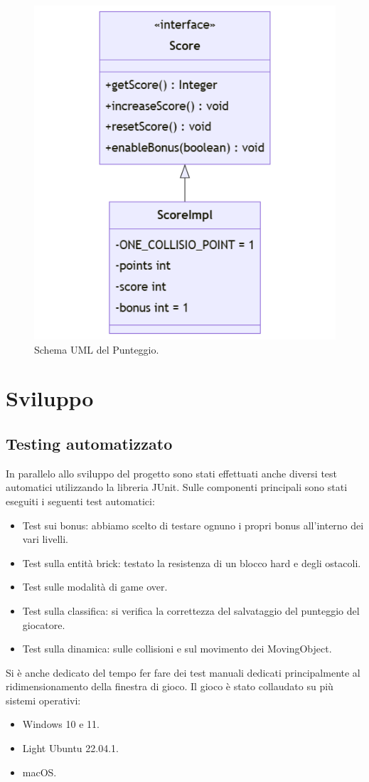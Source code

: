 \documentclass[a4paper,12pt]{report}
\begin{document}
\begin{figure}[H]
    \centering{}
    \includegraphics[scale=0.6]{images/Score.png}
    \caption{Schema UML del Punteggio.}
    \label{images:Score}
\end{figure}
\pagebreak
\chapter{Sviluppo}
\section{Testing automatizzato}
In parallelo allo sviluppo del progetto sono stati effettuati anche diversi test automatici utilizzando la libreria JUnit.
Sulle componenti principali sono stati eseguiti i seguenti test automatici:
\begin{itemize}
    \item Test sui bonus: abbiamo scelto di testare ognuno i propri bonus all'interno dei vari livelli.
    \item Test sulla entità brick: testato la resistenza di un blocco hard e degli ostacoli.
    \item Test sulle modalità di game over.
    \item Test sulla classifica: si verifica la correttezza del salvataggio del punteggio del giocatore.
    \item Test sulla dinamica: sulle collisioni e sul movimento dei MovingObject.
\end{itemize}
Si è anche dedicato del tempo fer fare dei test manuali dedicati principalmente al ridimensionamento della finestra di gioco.
Il gioco è stato collaudato su più sistemi operativi:
\begin{itemize}
    \item Windows 10 e 11.
    \item Light Ubuntu 22.04.1.
    \item macOS.
\end{itemize}
\end{document}
